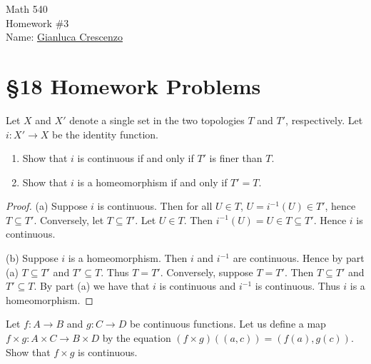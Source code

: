 \documentclass[12pt,twoside,openany]{memoir}
\begin{document}
\begin{center}
    {\Large Math 540 \\[0.1in]Homework \#3}\\[.175in]
    {Name:} {\underline{Gianluca Crescenzo\hspace*{2in}}}\\[0.15in]
    \end{center}
    \vspace{4pt}
\section*{\S 18 Homework Problems}
\begin{exercise}[manual-num={3}]
Let $X$ and $X'$ denote a single set in the two topologies $T$ and $T'$, respectively. Let $i:X' \rightarrow X$ be the identity function.
\begin{enumerate}[label = (\alph*),itemsep=1pt,topsep=3pt]
    \item Show that $i$ is continuous if and only if $T'$ is finer than $T$.
    \item Show that $i$ is a homeomorphism if and only if $T' = T$.
\end{enumerate}
\end{exercise}
    {\color{blue} \begin{proof}
        (a) Suppose $i$ is continuous. Then for all $U \in T$, $U = i^{-1}(U) \in T'$, hence $T \subseteq T'$. Conversely, let $T \subseteq T'$. Let $U \in T$. Then $i^{-1}(U) = U \in T \subseteq T'$. Hence $i$ is continuous.

        (b) Suppose $i$ is a homeomorphism. Then $i$ and $i^{-1}$ are continuous. Hence by part (a) $T \subseteq T'$ and $T' \subseteq T$. Thus $T = T'$. Conversely, suppose $T = T'$. Then $T \subseteq T'$ and $T' \subseteq T$. By part (a) we have that $i$ is continuous and $i^{-1}$ is continuous. Thus $i$ is a homeomorphism.
    \end{proof}}
\begin{exercise}[manual-num={10}]
Let $f:A \rightarrow B$ and $g:C \rightarrow D$ be continuous functions. Let us define a map $f \times g :A \times C \rightarrow B \times D$ by the equation $(f \times g)((a,c)) = (f(a),g(c))$. Show that $f \times g$ is continuous.
\end{exercise}
\end{document}
